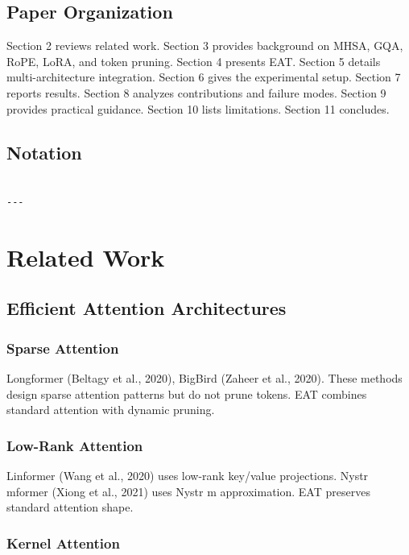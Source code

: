 \subsection{Paper Organization}

Section 2 reviews related work. Section 3 provides background on MHSA, GQA, 
RoPE, LoRA, and token pruning. Section 4 presents EAT. Section 5 details 
multi-architecture integration. Section 6 gives the experimental setup. 
Section 7 reports results. Section 8 analyzes contributions and failure 
modes. Section 9 provides practical guidance. Section 10 lists limitations. 
Section 11 concludes.



\subsection{Notation}

\begin{lstlisting}

---
\end{lstlisting}


\section{Related Work}

\subsection{Efficient Attention Architectures}

\subsubsection{Sparse Attention}

Longformer (Beltagy et al., 2020), BigBird (Zaheer et al., 2020). These 
methods design sparse attention patterns but do not prune tokens. EAT 
combines standard attention with dynamic pruning.

\subsubsection{Low-Rank Attention}

Linformer (Wang et al., 2020) uses low-rank key/value projections. 
Nystr mformer (Xiong et al., 2021) uses Nystr m approximation. EAT 
preserves standard attention shape.

\subsubsection{Kernel Attention}

